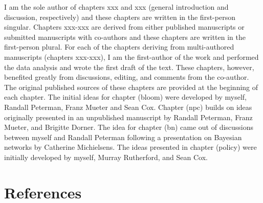 I am the sole author of chapters xxx and xxx (general introduction and
discussion, respectively) and these chapters are written in the
first-person singular. Chapters xxx-xxx are derived from either
published manuscripts or submitted manuscripts with co-authors and these
chapters are written in the first-person plural. For each of the
chapters deriving from multi-authored manuscripts (chapters xxx-xxx), I
am the first-author of the work and performed the data analysis and
wrote the first draft of the text. These chapters, however, benefited
greatly from discussions, editing, and comments from the co-author. The
original published sources of these chapters are provided at the
beginning of each chapter. The initial ideas for chapter (bloom) were
developed by myself, Randall Peterman, Franz Mueter and Sean Cox.
Chapter (npc) builds on ideas originally presented in an unpublished
manuscript by Randall Peterman, Franz Mueter, and Brigitte Dorner. The
idea for chapter (bn) came out of discussions between myself and Randall
Peterman following a presentation on Bayesian networks by Catherine
Michielsens. The ideas presented in chapter (policy) were initially
developed by myself, Murray Rutherford, and Sean Cox.

\chapter{References}\label{references}
